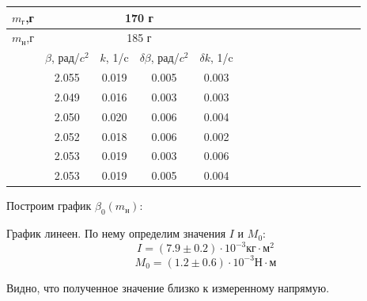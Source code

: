 \documentclass[14pt]{article}
\begin{document}
\begin{center}
\begin{tabular}{|c|c|c|c|c|c|c|c|c|c|c|c|c|c|c|c|}
\hline
$m_\text{г}$,г	&\multicolumn{4}{|c|}{170 г}			\\
\hline
$m_\text{н}$,г	&\multicolumn{4}{|c|}{185 г}		\\
\hline
				&	$\beta$, рад/$c^2$		&	$k$, 1/c		&	$\delta\beta$, рад/$c^2$		&	$\delta k$, 1/c			\\
\hline
				&	2.055					&	0.019			&	0.005							&	0.003					\\
\hline
				&	2.049					&	0.016			&	0.003							&	0.003					\\
\hline
				&	2.050					&	0.020			&	0.006							&	0.004					\\
\hline
				&	2.052					&	0.018			&	0.006							&	0.002					\\
\hline
				&	2.053					&	0.019			&	0.003							&	0.006					\\
\hline
				&	2.053					&	0.019			&	0.005							&	0.004					\\
\hline
\end{tabular}
\end{center}

\vspace{1cm}
\noindent Построим график $\beta_0(m_\text{н})$:

\begin{flushleft}
\end{flushleft}

\noindent График линеен. По нему определим значения $I$ и $M_0$:
$$I = (7.9 \pm 0.2) \cdot 10^{-3} \text{кг}\cdot\text{м}^2$$
$$M_0 = (1.2 \pm 0.6)\cdot 10^{-3} \text{Н}\cdot\text{м}$$

\noindent Видно, что полученное значение близко к измеренному напрямую.	
\end{document}
